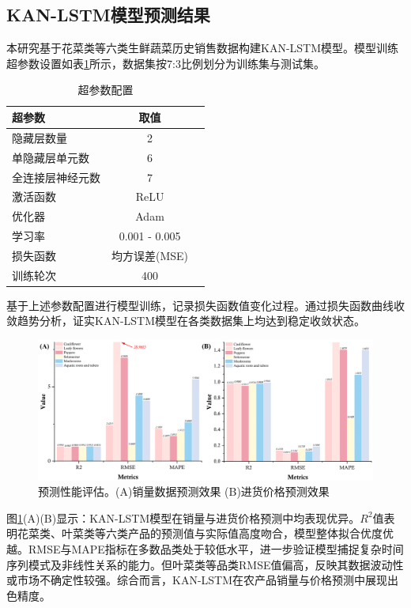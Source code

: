 \documentclass[lang=cn,12pt,a4paper]{elegantpaper}
\begin{document}
\subsection{KAN-LSTM模型预测结果}
\label{subsec:prediction_results}
本研究基于花菜类等六类生鲜蔬菜历史销售数据构建KAN-LSTM模型。模型训练超参数设置如表\ref{tab:hyperparameters}所示，数据集按7:3比例划分为训练集与测试集。

\begin{table}[H]
\centering
\caption{超参数配置}
\label{tab:hyperparameters}
\begin{tabular}{lcc}
\toprule
\textbf{超参数} & \textbf{取值} \\
\midrule
隐藏层数量 & 2 \\
单隐藏层单元数 & 6 \\
全连接层神经元数 & 7 \\
激活函数 & ReLU \\
优化器 & Adam \\
学习率 & 0.001 - 0.005 \\
损失函数 & 均方误差(MSE) \\
训练轮次 & 400 \\
\bottomrule
\end{tabular}
\end{table}

基于上述参数配置进行模型训练，记录损失函数值变化过程。通过损失函数曲线收敛趋势分析，证实KAN-LSTM模型在各类数据集上均达到稳定收敛状态。

\begin{figure}[H]
    \centering
    \includegraphics[width=1\textwidth]{图片4.png}
    \caption{预测性能评估。(A)销量数据预测效果 (B)进货价格预测效果}
    \label{fig:fig4}
\end{figure}

图\ref{fig:fig4}(A)(B)显示：KAN-LSTM模型在销量与进货价格预测中均表现优异。$R^2$值表明花菜类、叶菜类等六类产品的预测值与实际值高度吻合，模型整体拟合优度优越。RMSE与MAPE指标在多数品类处于较低水平，进一步验证模型捕捉复杂时间序列模式及非线性关系的能力。但叶菜类等品类RMSE值偏高，反映其数据波动性或市场不确定性较强。综合而言，KAN-LSTM在农产品销量与价格预测中展现出色精度。
\end{document}
